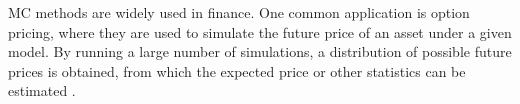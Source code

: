 \gls{MC} methods are widely used in finance. One common application is option pricing, where they are used to simulate the future price of an asset under a given model. By running a large number of simulations, a distribution of possible future prices is obtained, from which the expected price or other statistics can be estimated \citep[p.~105]{KellyConall2024CaSf}.







